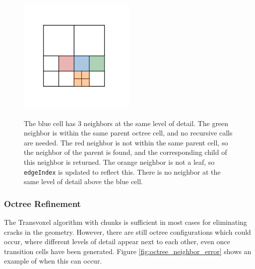 \documentclass{article}
\begin{document}
\begin{figure}
  \caption{The blue cell has 3 neighbors at the same level of detail. The green neighbor is within the same parent octree cell, and no recursive calls are needed. The red neighbor is not within the same parent cell, so the neighbor of the parent is found, and the corresponding child of this neighbor is returned. The orange neighbor is not a leaf, so \texttt{edgeIndex} is updated to reflect this. There is no neighbor at the same level of detail above the blue cell.}
  \includegraphics[width=0.5\textwidth]{octree_neighbors.png}
  \label{fig:octree_neighbors}
\end{figure}

\subsubsection{Octree Refinement}
\label{section:octree_refinement}
The Transvoxel algorithm with chunks is sufficient in most cases for eliminating cracks in the geometry. However, there are still octree configurations which could occur, where different levels of detail appear next to each other, even once transition cells have been generated. Figure \ref{fig:octree_neighbor_error} shows an example of when this can occur.
\end{document}

